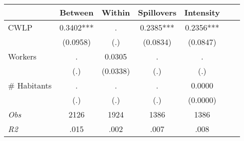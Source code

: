 \begin{tabular}{l*{6}{c}}\hline&\multicolumn{1}{c}{Between}&\multicolumn{1}{c}{Within}&\multicolumn{1}{c}{Spillovers}&\multicolumn{1}{c}{Intensity}\\ \hline 
CWLP & 0.3402*** & . & 0.2385*** & 0.2356*** \\
 & (0.0958) & (.) & (0.0834) & (0.0847) \\
Workers & . & 0.0305 & . & . \\
 & (.) & (0.0338) & (.) & (.) \\
\# Habitants & . & . & . & 0.0000 \\
  & (.) & (.) & (.) & (0.0000) \\
\hline \textit{Obs} & 2126 & 1924 & 1386 & 1386  \\ \textit{R2} & .015 & .002 & .007 & .008 \\ \hline \end{tabular}

